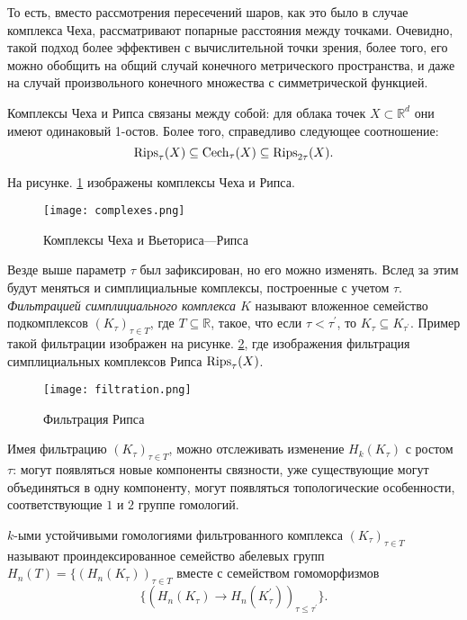 То есть, вместо рассмотрения пересечений шаров, как это было в случае комплекса Чеха, рассматривают попарные расстояния между точками. Очевидно, такой подход более эффективен с вычислительной точки зрения, более того, его можно обобщить на общий случай конечного метрического пространства, и даже на случай произвольного конечного множества с симметрической функцией.

Комплексы Чеха и Рипса связаны между собой: для облака точек $X \subset \mathbb{R}^d$ они имеют одинаковый 1-остов. Более того, справедливо следующее соотношение:
\[
	\mathrm{Rips}_\tau(X) \subseteq \mathrm{Cech}_\tau(X) \subseteq \mathrm{Rips}_{2\tau}(X).
\]

На рисунке. \ref{complexes} изображены комплексы Чеха и Рипса.

\begin{figure}[!htbp]
	\begin{center}
		\texttt{[image: complexes.png]}\\
		\caption{Комплексы Чеха и Вьеториса—Рипса}
		\label{complexes}
	\end{center}
\end{figure}

Везде выше параметр $\tau$ был зафиксирован, но его можно изменять. Вслед за этим будут меняться и симплициальные комплексы, построенные с учетом $\tau$. {\it Фильтрацией симплициального комплекса $K$} называют вложенное семейство подкомплексов $ (K_\tau)_{\tau \in T} $, где $ T \subseteq \mathbb{R} $, такое, что если $ \tau < \tau^{'} $, то $ K_\tau \subseteq K_{\tau^{'}} $. Пример такой фильтрации изображен на рисунке. \ref{ripsfilt}, где изображения фильтрация симплициальных комплексов Рипса $\mathrm{Rips}_\tau(X)$.

\begin{figure}[!htbp]
	\begin{center}
		\texttt{[image: filtration.png]}\\
		\caption{Фильтрация Рипса}
		\label{ripsfilt}
	\end{center}
\end{figure}

Имея фильтрацию $(K_\tau)_{\tau \in T}$, можно отслеживать изменение $H_k(K_\tau)$ с ростом $\tau$: могут появляться новые компоненты связности, уже существующие могут объединяться в одну компоненту, могут появляться топологические особенности, соответствующие $1$ и $2$ группе гомологий. 
\begin{definition}
	$k$-ыми устойчивыми гомологиями фильтрованного комплекса $ (K_\tau)_{\tau \in T} $ называют  проиндексированное семейство абелевых групп $H_n(T) = \{ (H_n(K_\tau))_{\tau \in T} $ вместе с семейством гомоморфизмов 
	\[\{(H_n(K_\tau) \to H_n(K_\tau^{'}))_{\tau \leq \tau^{'}} \}.\]
\end{definition}

